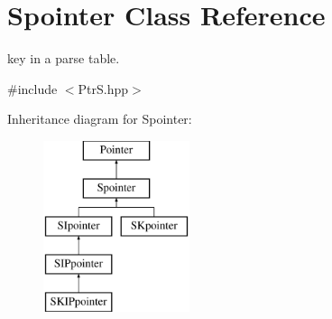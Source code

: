 \hypertarget{classSpointer}{}\section{Spointer Class Reference}
\label{classSpointer}


key in a parse table.  




{\ttfamily \#include $<$Ptr\+S.\+hpp$>$}

Inheritance diagram for Spointer\+:\begin{figure}[H]
\begin{center}
\leavevmode
\includegraphics[height=5.000000cm]{classSpointer}
\end{center}
\end{figure}
